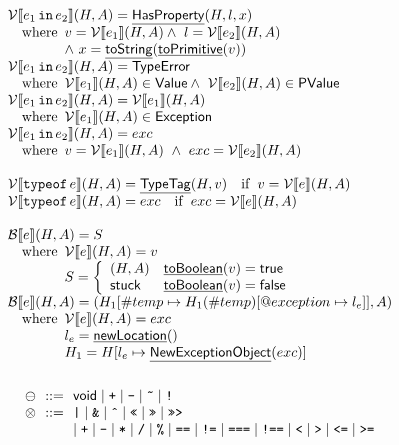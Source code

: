 \[\begin{array}{ll}
\V\lbr e_1\,\TT{in}\,e_2 \rbr (H,A)= \chf{HasProperty}(H,l,x)\\
\quad\wherec{
  v = \V\lbr e_1\rbr(H,A)
  \land\ l = \V\lbr e_2\rbr(H,A) \\
  \land\ x = \chf{toString}(\chf{toPrimitive}(v))
}
\\
\V\lbr e_1\,\TT{in}\,e_2 \rbr (H,A)
 = \exc{TypeError} \\
\quad\wherec{
  \V\lbr e_1\rbr(H,A) \in \SF{Value}
  \land\ \V\lbr e_2\rbr(H,A)\in\SF{PValue}
}
\\
\V\lbr e_1\,\TT{in}\,e_2 \rbr (H,A)
 = \V\lbr e_1\rbr(H,A) \\
\quad\wherec{
  \V\lbr e_1\rbr(H,A)\in\SF{Exception}
}
\\
\V\lbr e_1\,\TT{in}\,e_2 \rbr (H,A)
 = exc\\
\quad\wherec{
  v=\V\lbr e_1\rbr(H,A)
  \ \land\ exc=\V\lbr e_2\rbr(H,A)
}
\\\\
\V\lbr \TT{typeof}\,e \rbr (H,A) = \chf{TypeTag}(H,v)\quad\ifc{v=\V\lbr e\rbr(H,A)}
\\
\V\lbr \TT{typeof}\,e \rbr (H,A)
 = exc
\quad\ifc{
  exc=\V\lbr e\rbr(H,A)
}
\\\\

\B \lbr e \rbr(H,A)
 = S \\
\quad\wherec{
  \V \lbr e \rbr(H, A) = v\\
  S=\left\{
    \begin{array}{ll}
      (H, A) & \chf{toBoolean}(v) = \vtrue \\
      {\sf stuck} & \chf{toBoolean}(v) = \vfalse \\
    \end{array}
  \right.
}
\\
\B \lbr e \rbr(H,A) 
 = (H_1[\#temp \mapsto H_1(\#temp)[@exception \mapsto l_e]], A) \\
\quad\wherec{
   \V \lbr e \rbr(H, A) = exc \\
   l_e = \chf{newLocation}() \\
   H_1=H[l_e\mapsto\chf{NewExceptionObject}(exc)] \\
}
\\\\
\end{array}
\]
\[
\begin{array}{l@{~~}r@{~~}ll}

 \preop & ::= & \SF{void}
 \mid \TT{+} \mid \TT{-} \mid \TT{\~} \mid \TT{!} \\
 \inop & ::= &
 \TT{|} \mid \TT{\&} 
               \mid \TT{\^} \mid \TT{<<} \mid \TT{>>} \mid \TT{>>>} \\
& & \mid \TT{+} \mid \TT{-} \mid \TT{*} \mid \TT{/} \mid \TT{\%} \mid \TT{==} \mid \TT{!=} 
               \mid \TT{===} \mid \TT{!==} \mid \TT{<} \mid \TT{>} \mid \TT{<=} \mid \TT{>=} \\

\end{array}
\]

